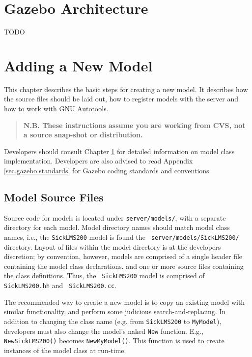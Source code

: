 \documentclass[11pt]{report}
\begin{document}

\chapter{Gazebo Architecture}
\label{sec.arch}

TODO



\chapter{Adding a New Model}

This chapter describes the basic steps for creating a new model.  It
describes how the source files should be laid out, how to register
models with the server and how to work with GNU Autotools.
\begin{quote}
{\bf N.B. These instructions assume you are working from CVS, not a
source snap-shot or distribution.}
\end{quote}
Developers should consult Chapter \ref{sec.arch} for detailed
information on model class implementation.  Developers are also
advised to read Appendix \ref{sec.gazebo.standards} for Gazebo coding
standards and conventions.


\section{Model Source Files}

Source code for models is located under {\tt server/models/}, with a
separate directory for each model.  Model directory names should match
model class names, i.e., the {\tt SickLMS200} model is found the {\tt
server/models/SickLMS200/} directory.
%
Layout of files within the model directory is at the developers
discretion; by convention, however, models are comprised of a single
header file containing the model class declarations, and one or more
source files containing the class definitions.  Thus, the {\tt
SickLMS200} model is comprised of {\tt SickLMS200.hh} and {\tt
SickLMS200.cc}.

The recommended way to create a new model is to copy an existing model
with similar functionality, and perform some judicious
search-and-replacing.  In addition to changing the class name
(e.g. from {\tt SickLMS200} to {\tt MyModel}), developers must also
change the model's naked {\tt New} function.  E.g., {\tt
NewSickLMS200()} becomes {\tt NewMyModel()}.  This function is used to
create instances of the model class at run-time.
\end{document}
